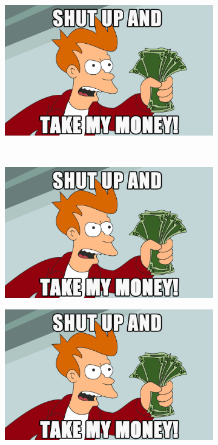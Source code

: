 \documentclass[paper=a4, fontsize=11pt, abstract=on]{scrartcl}
\numberwithin{equation}{section}		%
\numberwithin{figure}{section}			%
\numberwithin{table}{section}				%
\begin{document}
\begin{figure}[H]
        \centering
        \begin{subfigure}[h]{\textwidth}
                \includegraphics[width = 14.95cm]{jjj}
                \caption{}
				
        \end{subfigure}%
       ~~~~~
       
        \begin{subfigure}[h]{\textwidth}
                \includegraphics[width = 15.15cm]{jjj}
                \caption{}
                
        \end{subfigure}
        
        
        \begin{subfigure}[h]{\textwidth}
                \includegraphics[width = 15.35cm]{jjj}
                \caption{}
                

\end{subfigure}
\end{figure}
\end{document}
